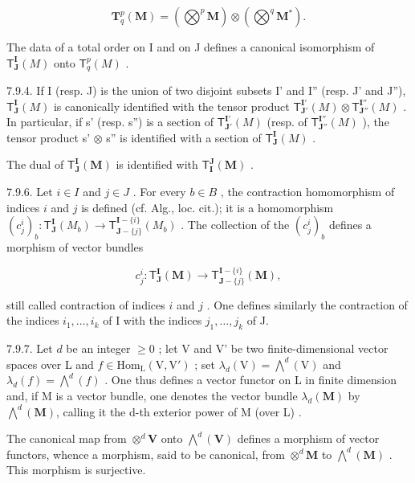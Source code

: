 \[
\mathbf {T} _ {q} ^ {p} (\mathbf {M}) = (\bigotimes^ {p} \mathbf {M}) \otimes (\bigotimes^ {q} \mathbf {M} ^ {*}).
\]

The data of a total order on I and on J defines a canonical isomorphism of \(\mathsf{T}_{\mathbf{J}}^{\mathbf{I}}(M)\) onto \(\mathsf{T}_{q}^{p}(M)\) .

7.9.4. If I (resp. J) is the union of two disjoint subsets I' and I'' (resp. J' and J''), \(\mathsf{T}_{\mathbf{J}}^{\mathbf{I}}(M)\) is canonically identified with the tensor product \(\mathsf{T}_{\mathbf{J}'}^{\mathbf{I}'}(M) \otimes \mathsf{T}_{\mathbf{J}''}^{\mathbf{I}''}(M)\) . In particular, if s' (resp. s'') is a section of \(\mathsf{T}_{\mathbf{J}'}^{\mathbf{I}'}(M)\) (resp. of \(\mathsf{T}_{\mathbf{J}''}^{\mathbf{I}''}(M)\) ), the tensor product s' \(\otimes\) s'' is identified with a section of \(\mathsf{T}_{\mathbf{J}}^{\mathbf{I}}(M)\) .

The dual of \(\mathsf{T}_{\mathbf{J}}^{\mathbf{I}}(\mathbf{M})\) is identified with \(\mathsf{T}_{\mathbf{I}}^{\mathbf{J}}(\mathbf{M})\) .

7.9.6. Let \(i \in I\) and \(j \in J\) . For every \(b \in B\) , the contraction homomorphism of indices \(i\) and \(j\) is defined (cf. Alg., loc. cit.); it is a homomorphism \((c_j^i)_b: \mathsf{T}_{\mathbf{J}}^{\mathbf{I}}(M_b) \to \mathsf{T}_{\mathbf{J}-\{j\}}^{\mathbf{I}-\{i\}}(M_b)\) . The collection of the \((c_j^i)_b\) defines a morphism of vector bundles

\[
c _ {j} ^ {i}: \mathsf {T} _ {\mathbf {J}} ^ {\mathbf {I}} (\mathbf {M}) \to \mathsf {T} _ {\mathbf {J} - \{j \}} ^ {\mathbf {I} - \{i \}} (\mathbf {M}),
\]

still called contraction of indices \(i\) and \(j\) . One defines similarly the contraction of the indices \(i_{1},\ldots,i_{k}\) of I with the indices \(j_{1},\ldots,j_{k}\) of J.

7.9.7. Let \(d\) be an integer \(\geqslant 0\) ; let V and V' be two finite-dimensional vector spaces over L and \(f \in \mathrm{Hom}_{\mathrm{L}}(\mathrm{V}, \mathrm{V}')\) ; set \(\lambda_{d}(\mathrm{V}) = \bigwedge^{d}(\mathrm{V})\) and \(\lambda_{d}(f) = \bigwedge^{d}(f)\) . One thus defines a vector functor on L in finite dimension and, if M is a vector bundle, one denotes the vector bundle \(\lambda_{d}(\mathbf{M})\) by \(\bigwedge^{d}(\mathbf{M})\), calling it the d-th exterior power of M (over L) .

The canonical map from \(\otimes^{d}\mathbf{V}\) onto \(\bigwedge^{d}(\mathbf{V})\) defines a morphism of vector functors, whence a morphism, said to be canonical, from \(\otimes^{d}\mathbf{M}\) to \(\bigwedge^{d}(\mathbf{M})\) . This morphism is surjective.

